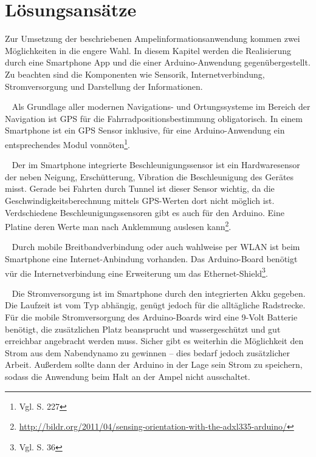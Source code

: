 \chapter{Lösungsansätze}
Zur Umsetzung der beschriebenen Ampelinformationsanwendung kommen zwei Möglichkeiten in die engere Wahl. In diesem Kapitel werden die Realisierung durch eine \gls{Smartphone} \Gls{App} und die einer \gls{Arduino}-Anwendung gegenübergestellt. Zu beachten sind die Komponenten wie Sensorik, Internetverbindung, Stromversorgung und Darstellung der Informationen.\\
\begin{description}[leftmargin=0.7cm,style=nextline]
  \item[\gls{GPS}] ~ Als Grundlage aller modernen Navigations- und Ortungssysteme im Bereich der Navigation ist \gls{GPS} für die Fahrradpositionsbestimmung obligatorisch. In einem \gls{Smartphone} ist ein \gls{GPS} Sensor inklusive, für eine \gls{Arduino}-Anwendung ein entsprechendes Modul vonnöten\footnote{ Vgl. \cite{arduino} S. 227}.\\
  \item[Beschleunigungssensor] ~ Der im \gls{Smartphone} integrierte Beschleunigungssensor ist ein Hardwaresensor der neben Neigung, Erschütterung, Vibration die Beschleunigung des Gerätes misst. Gerade bei Fahrten durch Tunnel ist dieser Sensor wichtig, da die Geschwindigkeitsberechnung mittels \gls{GPS}-Werten dort nicht möglich ist. Verdschiedene Beschleunigungssensoren gibt es auch für den \gls{Arduino}. Eine Platine deren Werte man nach Anklemmung auslesen kann\footnote{\url{http://bildr.org/2011/04/sensing-orientation-with-the-adxl335-arduino/}}.
\\
  \item[Internetverbindung] ~ Durch mobile Breitbandverbindung oder auch wahlweise per \gls{WLAN} ist beim \gls{Smartphone} eine Internet-Anbindung vorhanden. 
  Das \gls{Arduino}-Board benötigt vür die Internetverbindung eine Erweiterung um das Ethernet-Shield\footnote{ Vgl. \cite{arduino} S. 36}.\\
  \item[Stromversorgung] ~ Die Stromversorgung ist im \gls{Smartphone} durch den integrierten Akku gegeben. Die Laufzeit ist vom Typ abhängig, genügt jedoch für die alltägliche Radstrecke. Für die mobile Stromversorgung des \gls{Arduino}-Boards wird eine 9-Volt Batterie benötigt, die zusätzlichen Platz beansprucht und wassergeschützt und gut erreichbar angebracht werden muss. Sicher gibt es weiterhin die Möglichkeit den Strom aus dem Nabendynamo zu gewinnen -- dies bedarf jedoch zusätzlicher Arbeit. Außerdem sollte dann der \gls{Arduino} in der Lage sein Strom zu speichern, sodass die Anwendung beim Halt an der Ampel nicht ausschaltet.\\

\end{description}
